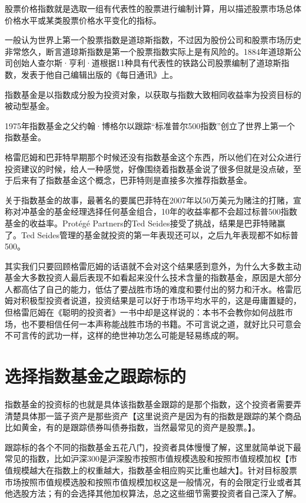 \documentclass[12pt,oneside]{book}
\begin{document}
股票价格指数就是选取一组有代表性的股票进行编制计算，用以描述股票市场总体价格水平或某类股票价格水平变化的指标。

一般认为世界上第一个股票指数是道琼斯指数，不过因为股份公司和股票市场历史非常悠久，断言道琼斯指数是第一个股票指数实际上是有风险的。1884年道琼斯公司创始人查尔斯·亨利·道根据11种具有代表性的铁路公司股票编制了道琼斯指数，发表于他自己编辑出版的《每日通讯》上。

指数基金是以指数成分股为投资对象，以获取与指数大致相同收益率为投资目标的被动型基金。

1975年指数基金之父约翰·博格尔以跟踪“标准普尔500指数”创立了世界上第一个指数基金。

格雷厄姆和巴菲特早期那个时候还没有指数基金这个东西，所以他们在对公众进行投资建议的时候，给人一种感觉，好像围绕着指数基金说了很多但就是没点破，至于后来有了指数基金这个概念，巴菲特则是直接多次推荐指数基金。

关于指数基金的故事，最著名的要属巴菲特在2007年以50万美元为赌注的打赌，宣称对冲基金的基金经理选择任何基金组合，10年的收益率都不会超过标普500指数基金的收益率。Protégé Partners的Ted Seides接受了挑战，结果是巴菲特赌赢了。Ted Seides管理的基金就投资的第一年表现还可以，之后九年表现都不如标普500。

其实我们只要回顾格雷厄姆的话语就不会对这个结果感到意外，为什么大多数主动基金大多数投资人最后表现不如看起来没什么技术含量的指数基金，原因是大部分人都高估了自己的能力，低估了要战胜市场的难度和要付出的努力和汗水。格雷厄姆对积极型投资者说道，投资结果是可以好于市场平均水平的，这是毋庸置疑的，但格雷厄姆在《聪明的投资者》一书中却是这样说的：本书不会教你如何战胜市场，也不要相信任何一本声称能战胜市场的书籍。不可言说之道，就好比只可意会不可言传的武功一样，这样的绝世神功怎么可能是轻易练成的啊。


\section{选择指数基金之跟踪标的}
指数基金的投资标的也就是具体该指数基金跟踪的是那个指数，这个投资者需要弄清楚具体那一篮子资产是那些资产【这里说资产是因为有的指数是跟踪的某个商品比如黄金，有的是跟踪债券叫债券指数，当然最常见的资产是股票。】。

跟踪标的各个不同的指数基金五花八门，投资者具体慢慢了解，这里就简单说下最常见的指数，比如沪深300是沪深股市按照市值规模选股和按照市值规模加权【市值规模越大在指数上的权重越大，指数基金相应购买比重也越大】。针对目标股票市场按照市值规模选股和按照市值规模加权这是一般情况，有的会限定行业或者其他选股方法；有的会选择其他加权算法，总之这些细节需要投资者自己深入了解。
\end{document}
